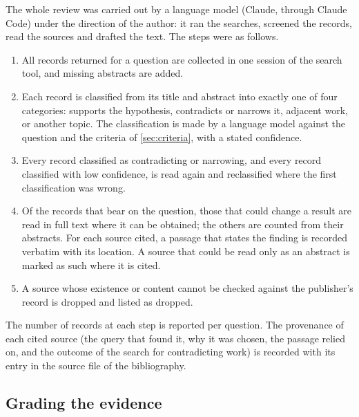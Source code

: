 The whole review was carried out by a language model (Claude, through
Claude Code) under the direction of the author: it ran the searches,
screened the records, read the sources and drafted the text.
The steps were as follows.
\begin{enumerate}
  \item All records returned for a question are collected in one session
    of the search tool, and missing abstracts are added.
  \item Each record is classified from its title and abstract into
    exactly one of four categories: supports the hypothesis, contradicts
    or narrows it, adjacent work, or another topic.
    The classification is made by a language model against the question
    and the criteria of \cref{sec:criteria}, with a stated confidence.
  \item Every record classified as contradicting or narrowing, and every
    record classified with low confidence, is read again and reclassified
    where the first classification was wrong.
  \item Of the records that bear on the question, those that could
    change a result are read in full text where it can be obtained; the
    others are counted from their abstracts.
    For each source cited, a passage that states the finding is
    recorded verbatim with its location.
    A source that could be read only as an abstract is marked as such
    where it is cited.
  \item A source whose existence or content cannot be checked against
    the publisher's record is dropped and listed as dropped.
\end{enumerate}
The number of records at each step is reported per question.
The provenance of each cited source (the query that found it, why it was
chosen, the passage relied on, and the outcome of the search for
contradicting work) is recorded with its entry in the source file of the
bibliography.

\subsection{Grading the evidence}\label{sec:grading}


